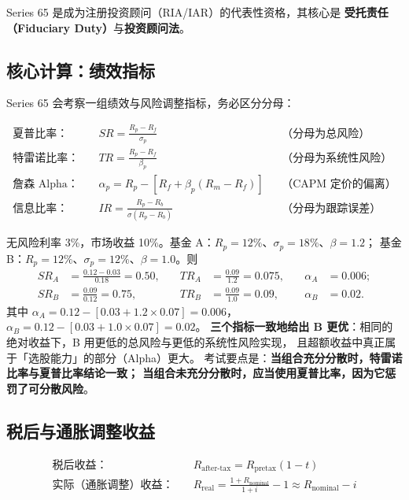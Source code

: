 Series 65 是成为注册投资顾问（RIA/IAR）的代表性资格，其核心是
\textbf{受托责任（Fiduciary Duty）}与\textbf{投资顾问法}。

\subsection{核心计算：绩效指标}

Series 65 会考察一组绩效与风险调整指标，务必区分分母：

\begin{align}
  \text{夏普比率：}\quad & SR = \frac{R_p-R_f}{\sigma_p} && \text{（分母为总风险）}\\
  \text{特雷诺比率：}\quad & TR = \frac{R_p-R_f}{\beta_p} && \text{（分母为系统性风险）}\\
  \text{詹森 Alpha：}\quad & \alpha_p = R_p-\left[R_f+\beta_p\left(R_m-R_f\right)\right] && \text{（CAPM 定价的偏离）}\\
  \text{信息比率：}\quad & IR = \frac{R_p-R_b}{\sigma\left(R_p-R_b\right)} && \text{（分母为跟踪误差）}
\end{align}

\begin{example}[同样 12\% 收益，哪个基金经理更好]\label{ex:12-perf}
无风险利率 3\%，市场收益 10\%。基金 A：$R_p = 12\%$、$\sigma_p = 18\%$、$\beta = 1.2$；
基金 B：$R_p = 12\%$、$\sigma_p = 12\%$、$\beta = 1.0$。则
\begin{align*}
  SR_A &= \frac{0.12-0.03}{0.18} = 0.50, &\quad
  TR_A &= \frac{0.09}{1.2} = 0.075, &\quad
  \alpha_A &= 0.006;\\
  SR_B &= \frac{0.09}{0.12} = 0.75, &\quad
  TR_B &= \frac{0.09}{1.0} = 0.09, &\quad
  \alpha_B &= 0.02.
\end{align*}
其中 $\alpha_A = 0.12-\left[0.03+1.2\times0.07\right] = 0.006$，
$\alpha_B = 0.12-\left[0.03+1.0\times0.07\right] = 0.02$。
\textbf{三个指标一致地给出 B 更优}：相同的绝对收益下，B 用更低的总风险与更低的系统性风险实现，
且超额收益中真正属于「选股能力」的部分（Alpha）更大。
考试要点是：\textbf{当组合充分分散时，特雷诺比率与夏普比率结论一致；
当组合未充分分散时，应当使用夏普比率，因为它惩罚了可分散风险}。
\end{example}

\subsection{税后与通胀调整收益}

\begin{align}
  \text{税后收益：}\quad & R_{\text{after-tax}} = R_{\text{pretax}}\left(1-t\right) \label{eq:12-aftertax}\\
  \text{实际（通胀调整）收益：}\quad & R_{\text{real}} = \frac{1+R_{\text{nominal}}}{1+i}-1 \approx R_{\text{nominal}}-i \label{eq:12-real}
\end{align}

